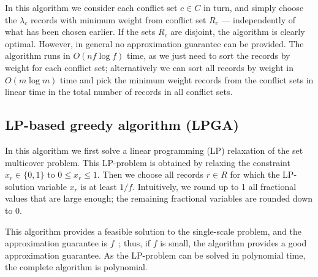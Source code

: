 In this algorithm we consider each conflict set $c \in C$ in turn, and simply choose the $\lambda_c$ records with minimum weight from conflict set $R_c$ --- independently of what has been chosen earlier. If the sets $R_c$ are disjoint, the algorithm is clearly optimal. However, in general no approximation guarantee can be provided. The algorithm runs in $O(n f \log f)$ time, as we just need to sort the records by weight for each conflict set; alternatively we can sort all records by weight in $O(m \log m)$ time and pick the minimum weight records from the conflict sets in linear time in the total number of records in all conflict sets.


\subsection{LP-based greedy algorithm (LPGA)}
\label{sec:algorithms:lpga}

In this algorithm we first solve a linear programming (LP) relaxation of the set multicover problem. This LP-problem is obtained by relaxing the constraint $x_r \in \{0, 1\}$ to $0 \leq x_r \leq 1$. Then we choose all records $r \in R$ for which the LP-solution variable $x_r$ is at least $1 / f$. Intuitively, we round up to 1 all fractional values that are large enough; the remaining fractional variables are rounded down to 0. 

This algorithm provides a feasible solution to the single-scale problem, and the approximation guarantee is $f$~\cite{vazirani2001approximation}; thus, if $f$ is small, the algorithm provides a good approximation guarantee. As the LP-problem can be solved in polynomial time, the complete algorithm is polynomial.




